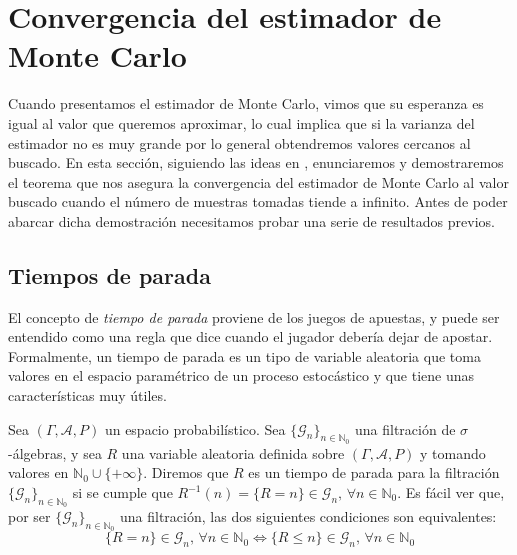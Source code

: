 \section{Convergencia del estimador de Monte Carlo}

Cuando presentamos el estimador de Monte Carlo, vimos que su esperanza es igual al valor que queremos aproximar, lo cual implica que si la varianza del estimador no es muy grande por lo general obtendremos valores cercanos al buscado. En esta sección, siguiendo las ideas en \cite{Graham2013}, enunciaremos y demostraremos el teorema que nos asegura la convergencia del estimador de Monte Carlo al valor buscado cuando el número de muestras tomadas tiende a infinito. Antes de poder abarcar dicha demostración necesitamos probar una serie de resultados previos.


\subsection{Tiempos de parada}
El concepto de \emph{tiempo de parada} proviene de los juegos de apuestas, y puede ser entendido como una regla que dice cuando el jugador debería dejar de apostar. Formalmente, un tiempo de parada es un tipo de variable aleatoria que toma valores en el espacio paramétrico de un proceso estocástico y que tiene unas características muy útiles.

\begin{definicion}
Sea $(\Gamma , \mathcal{A}, P)$ un espacio probabilístico. Sea $\{\mathscr{G}_n\}_{n\in \mathds{N}_0}$ una filtración de $\sigma$-álgebras, y sea $R$ una variable aleatoria definida sobre $(\Gamma , \mathcal{A}, P)$ y tomando valores en $\mathds{N}_0\cup \{+\infty \}$. Diremos que $R$ es un tiempo de parada para la filtración $\{\mathscr{G}_n\}_{n\in \mathds{N}_0}$ si se cumple que $R^{-1}(n)=\{R = n\} \in \mathscr{G}_n\text{, }\forall n\in \mathds{N}_0$. Es fácil ver que, por ser $\{\mathscr{G}_n\}_{n\in \mathds{N}_0}$ una filtración, las dos siguientes condiciones son equivalentes:
\begin{equation}\label{ecTParada}
\{R = n\} \in \mathscr{G}_n\text{, }\forall n\in \mathds{N}_0 \Leftrightarrow \{R \leq n\} \in \mathscr{G}_n\text{, }\forall n\in \mathds{N}_0 
\end{equation}
\end{definicion}

